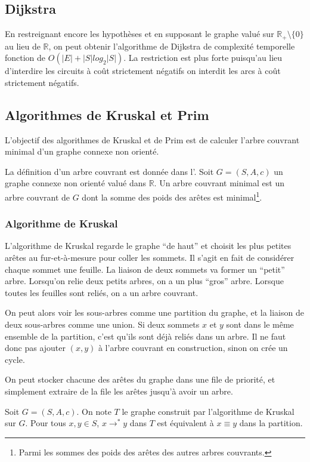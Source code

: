 \documentclass[../../../main.tex]{subfiles}
\begin{document}
\subsection{Dijkstra}
En restreignant encore les hypothèses et en supposant le graphe valué sur $\mathbb{R}_+\setminus\{0\}$ au lieu de $\mathbb{R}$, on
peut obtenir l'algorithme de Dijkstra de complexité temporelle fonction de $O(|E| + |S|log_2|S|)$. La
restriction est plus forte puisqu'au lieu d'interdire les circuits à coût strictement négatifs on interdit
les arcs à coût strictement négatifs.
\subsection{Algorithmes de Kruskal et Prim}
L'objectif des algorithmes de Kruskal et de Prim est de calculer l'arbre couvrant minimal d'un graphe
connexe non orienté.

La définition d'un arbre couvrant est donnée dans l'.
 {
	Soit $G = (S, A, c)$ un graphe connexe non orienté valué dans $\mathbb{R}$. Un arbre couvrant minimal est
un arbre couvrant de $G$ dont la somme des poids des arêtes est minimal\footnote{Parmi les sommes des poids des arêtes des autres arbres couvrants.}.
}
\subsubsection{Algorithme de Kruskal}
L'algorithme de Kruskal regarde le graphe ``de haut'' et choisit les plus petites arêtes au fur-et-à-mesure
pour coller les sommets. Il s'agit en fait de considérer chaque sommet une feuille. La liaison de deux
sommets va former un ``petit'' arbre. Lorsqu'on relie deux petits arbres, on a un plus ``gros'' arbre.
Lorsque toutes les feuilles sont reliés, on a un arbre couvrant.

On peut alors voir les sous-arbres comme une partition du graphe, et la liaison de deux sous-arbres
comme une union. Si deux sommets $x$ et $y$ sont dans le même ensemble de la partition, c'est qu'ils sont
déjà reliés dans un arbre. Il ne faut donc pas ajouter $(x, y)$ à l'arbre couvrant en construction, sinon on
crée un cycle.

On peut stocker chacune des arêtes du graphe dans une file de priorité, et simplement extraire de la
file les arêtes jusqu'à avoir un arbre.

\lemma{} Soit $G = (S, A, c)$. On note $T$ le graphe construit par l'algorithme de Kruskal sur $G$. Pour
tous $x, y\in S$, $x\rightarrow^* y$ dans $T$ est équivalent à $x\equiv y$ dans la partition.
\end{document}
